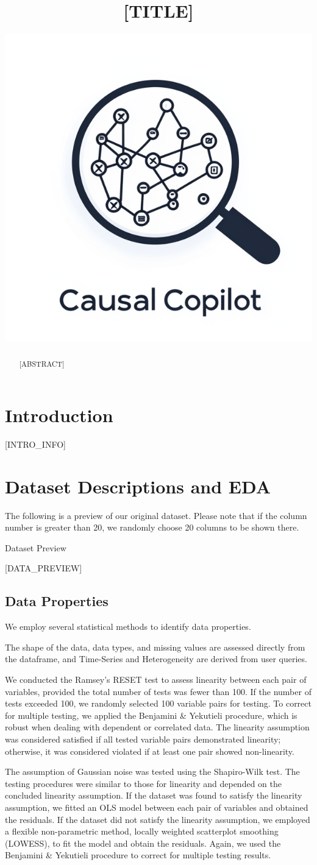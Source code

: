 \documentclass{article}
\title{[TITLE]}
\author{ \href{https://orcid.org/0000-0000-0000-0000}{\includegraphics[scale=0.06]{asset/logo.png}} }
\begin{document}
\maketitle

\begin{abstract}
[ABSTRACT]
\end{abstract}


\raggedbottom
\section{Introduction}
[INTRO_INFO]

\section{Dataset Descriptions and EDA}
The following is a preview of our original dataset. Please note that if the column number is greater than 20,
we randomly choose 20 columns to be shown there.

\begin{table}[H]
    \centering
    \caption{Dataset Preview}
    [DATA_PREVIEW]
\end{table}

\subsection{Data Properties}
We employ several statistical methods to identify data properties.

The shape of the data, data types, and missing values are assessed directly from the dataframe, and Time-Series and Heterogeneity are derived from user queries.

We conducted the Ramsey's RESET test to assess linearity between each pair of variables, provided the total number of tests was fewer than 100. If the number of tests exceeded 100, we randomly selected 100 variable pairs for testing.
To correct for multiple testing, we applied the Benjamini & Yekutieli procedure, which is robust when dealing with dependent or correlated data. 
The linearity assumption was considered satisfied if all tested variable pairs demonstrated linearity; otherwise, it was considered violated if at least one pair showed non-linearity.

The assumption of Gaussian noise was tested using the Shapiro-Wilk test. The testing procedures were similar to those for linearity and depended on the concluded linearity assumption. 
If the dataset was found to satisfy the linearity assumption, we fitted an OLS model between each pair of variables and obtained the residuals. 
If the dataset did not satisfy the linearity assumption, we employed a flexible non-parametric method, locally weighted scatterplot smoothing (LOWESS), to fit the model and obtain the residuals. 
Again, we used the Benjamini & Yekutieli procedure to correct for multiple testing results. 
\end{document}
